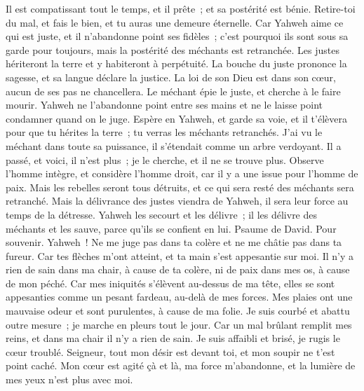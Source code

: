 \begin{multicols}{2}
Il est compatissant tout le temps, et il prête~; et sa postérité est bénie.
 Retire-toi du mal, et fais le bien, et tu auras une demeure éternelle.
Car Yahweh aime ce qui est juste, et il n'abandonne point ses fidèles~; c'est pourquoi ils sont sous sa garde pour toujours, mais la postérité des méchants est retranchée.
 Les justes hériteront la terre et y habiteront à perpétuité.
 La bouche du juste prononce la sagesse, et sa langue déclare la justice.
La loi de son Dieu est dans son cœur, aucun de ses pas ne chancellera.
 Le méchant épie le juste, et cherche à le faire mourir.
Yahweh ne l'abandonne point entre ses mains et ne le laisse point condamner quand on le juge.
 Espère en Yahweh, et garde sa voie, et il t'élèvera pour que tu hérites la terre~; tu verras les méchants retranchés.
 J'ai vu le méchant dans toute sa puissance, il s'étendait comme un arbre verdoyant.
Il a passé, et voici, il n'est plus~; je le cherche, et il ne se trouve plus.
 Observe l'homme intègre, et considère l'homme droit, car il y a une issue pour l'homme de paix.
Mais les rebelles seront tous détruits, et ce qui sera resté des méchants sera retranché.
 Mais la délivrance des justes viendra de Yahweh, il sera leur force au temps de la détresse.
Yahweh les secourt et les délivre~; il les délivre des méchants et les sauve, parce qu'ils se confient en lui.
\VerseOne{}Psaume de David. Pour souvenir.
Yahweh~! Ne me juge pas dans ta colère et ne me châtie pas dans ta fureur.
Car tes flèches m'ont atteint, et ta main s'est appesantie sur moi.
Il n'y a rien de sain dans ma chair, à cause de ta colère, ni de paix dans mes os, à cause de mon péché.
Car mes iniquités s'élèvent au-dessus de ma tête, elles se sont appesanties comme un pesant fardeau, au-delà de mes forces.
Mes plaies ont une mauvaise odeur et sont purulentes, à cause de ma folie.
Je suis courbé et abattu outre mesure~; je marche en pleurs tout le jour.
Car un mal brûlant remplit mes reins, et dans ma chair il n'y a rien de sain.
Je suis affaibli et brisé, je rugis le cœur troublé.
Seigneur, tout mon désir est devant toi, et mon soupir ne t'est point caché.
Mon cœur est agité çà et là, ma force m'abandonne, et la lumière de mes yeux n'est plus avec moi.

\end{multicols}
